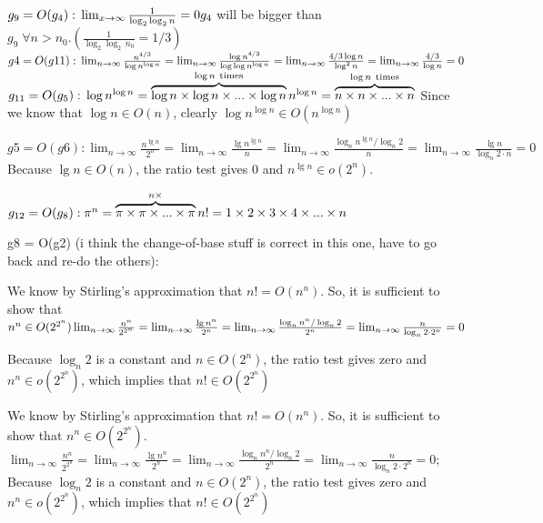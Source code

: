 \documentclass{article}
\begin{document}
$g_9 = O(g_4):\\
\lim_{x\to\infty}\frac{1}{\log_2 \log_2 n} = 0\\ 
g_4 $ will be bigger than $g_9 \; \forall n>n_0.(\frac{1}{\log_2 \log_2\, n_0} =
1/3)$\\

$g4 = O(g11):\\
\lim_{n\to\infty}\frac{n^{4/3}}{\log n^{\log n}} = \lim_{n\to\infty}
\frac{\log n^{4/3}}{\log\log n^{\log n}} = \lim_{n\to\infty}\frac{4/3\log n}
{\log^2n}=\lim_{n\to\infty}\frac{4/3}{\log n} = 0$\\

$g_{11} = O(g_5):\\
\log n^{\log n} = \overbrace {\log n \times \log n \times ... \times \log
n}^{\log n \mathrm{\ times}}\\
n^{\log n} = \overbrace {n \times n \times ... \times n}^{\log n \mathrm{\
times}}$
Since we know that $\log n \in O(n)$, clearly $\log n^{\log n} \in O(n^{\log
n})$


$g5 = O(g6):
\lim_{n \to \infty}\frac{n^{\lg n}}{2^n} = \lim_{n \to \infty}\frac{\lg
n^{\lg n}}{n} = \lim_{n \to \infty}\frac{\log_n n^{\lg n}/\log_n2}{n} =
\lim_{n \to \infty}\frac{\lg n}{\log_n2\cdot n} = 0$
Because $\lg n \in O(n)$, the ratio test gives 0 and $n^{\lg n} \in o(2^n)$.

$g_{12} = O(g_8):\\
\pi^{n} = \overbrace{\pi \times \pi \times ... \times \pi}^{n \mathrm{\times}}\\
n! = 1 \times 2 \times 3 \times 4 \times ... \times n$


g8 = O(g2) (i think the change-of-base stuff is correct in this one, have
to go back and re-do the others):

We know by Stirling's approximation that $n! = O(n^n)$. So, it is
sufficient to show that $n^n \in O(2^{2^n})\\
\lim_{n \to \infty}\frac{n^n}{2^{2^n}} = \lim_{n \to \infty}\frac{\lg
n^n}{2^n} = \lim_{n \to \infty}\frac{\log_n n^n/\log_n2}{2^n} = \lim_{n \to
\infty}\frac{n}{\log_n2\cdot2^n} = 0$

Because $\log_n2$ is a constant and $n \in O(2^n)$, the ratio test gives
zero and $n^n \in o(2^{2^n})$, which implies that $n! \in O(2^{2^n})$

We know by Stirling's approximation that $n! = O(n^n)$. So, it is
sufficient to show that $n^n \in O(2^{2^n})$.
$
\lim_{n \to \infty}\frac{n^n}{2^{2^n}} = \lim_{n \to \infty}\frac{\lg
n^n}{2^n} = \lim_{n \to \infty}\frac{\log_n n^n/\log_n2}{2^n} = \lim_{n \to
\infty}\frac{n}{\log_n2\cdot2^n} = 0;$
 \\ Because $\log_n 2$ is a constant and $n \in O(2^n)$, the ratio test gives
 zero and $n^n \in o(2^{2^n})$, which implies that $n! \in O(2^{2^n})$
\end{document}
